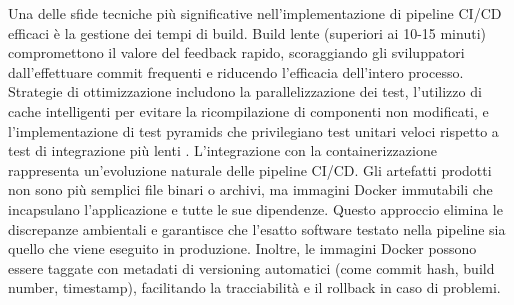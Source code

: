 \documentclass[12pt,a4paper,openright,twoside]{book}
\begin{document}
Una delle sfide tecniche più significative nell'implementazione di pipeline CI/CD efficaci è la gestione dei tempi di build. Build lente (superiori ai 10-15 minuti) compromettono il valore del feedback rapido, scoraggiando gli sviluppatori dall'effettuare commit frequenti e riducendo l'efficacia dell'intero processo. Strategie di ottimizzazione includono la parallelizzazione dei test, l'utilizzo di cache intelligenti per evitare la ricompilazione di componenti non modificati, e l'implementazione di test pyramids che privilegiano test unitari veloci rispetto a test di integrazione più lenti \cite{ghaleb2019empirical}.
L'integrazione con la containerizzazione rappresenta un'evoluzione naturale delle pipeline CI/CD. Gli artefatti prodotti non sono più semplici file binari o archivi, ma immagini Docker immutabili che incapsulano l'applicazione e tutte le sue dipendenze. Questo approccio elimina le discrepanze ambientali e garantisce che l'esatto software testato nella pipeline sia quello che viene eseguito in produzione. Inoltre, le immagini Docker possono essere taggate con metadati di versioning automatici (come commit hash, build number, timestamp), facilitando la tracciabilità e il rollback in caso di problemi.
\end{document}
